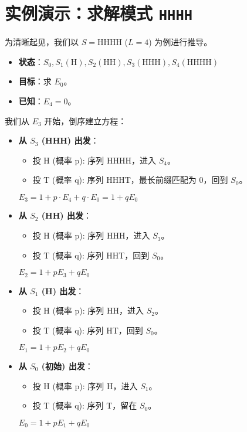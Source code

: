 \documentclass[UTF8]{ctexart}
\begin{document}
\section{实例演示：求解模式 \texttt{HHHH}}
为清晰起见，我们以 $S = \text{HHHH}$ ($L=4$) 为例进行推导。
\begin{itemize}
    \item \textbf{状态}：$S_0, S_1(\text{H}), S_2(\text{HH}), S_3(\text{HHH}), S_4(\text{HHHH})$
    \item \textbf{目标}：求 $E_0$。
    \item \textbf{已知}：$E_4 = 0$。
\end{itemize}
我们从 $E_3$ 开始，倒序建立方程：
\begin{itemize}
    \item \textbf{从 $S_3$ (HHH) 出发}：
        \begin{itemize}
            \item 投 H (概率 p): 序列 HHHH，进入 $S_4$。
            \item 投 T (概率 q): 序列 HHHT，最长前缀匹配为 0，回到 $S_0$。
        \end{itemize}
        $E_3 = 1 + p \cdot E_4 + q \cdot E_0 = 1 + q E_0$

    \item \textbf{从 $S_2$ (HH) 出发}：
        \begin{itemize}
            \item 投 H (概率 p): 序列 HHH，进入 $S_3$。
            \item 投 T (概率 q): 序列 HHT，回到 $S_0$。
        \end{itemize}
        $E_2 = 1 + p E_3 + q E_0$

    \item \textbf{从 $S_1$ (H) 出发}：
        \begin{itemize}
            \item 投 H (概率 p): 序列 HH，进入 $S_2$。
            \item 投 T (概率 q): 序列 HT，回到 $S_0$。
        \end{itemize}
        $E_1 = 1 + p E_2 + q E_0$

    \item \textbf{从 $S_0$ (初始) 出发}：
        \begin{itemize}
            \item 投 H (概率 p): 序列 H，进入 $S_1$。
            \item 投 T (概率 q): 序列 T，留在 $S_0$。
        \end{itemize}
        $E_0 = 1 + p E_1 + q E_0$
\end{itemize}
\end{document}
